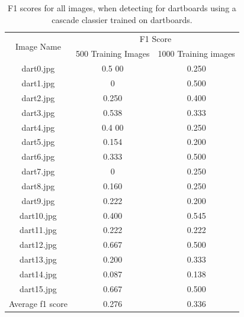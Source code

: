 \documentclass[conference]{IEEEtran}
\begin{document}
\begin{table}[htp]
\caption{F1 scores for all images, when detecting for dartboards using a cascade classier trained on dartboards.}
\begin{center}
\begin{tabular}{||c|c|c||}
\hline
\multirow{2}{*}{Image Name} & \multicolumn{2}{c||}{F1 Score}                \\ 
                                 & 500 Training Images	& 1000 Training images \\ \hline
dart0.jpg			& 0.5	00	&	0.250	\\
dart1.jpg			& 0		&	0.500	\\
dart2.jpg			& 0.250	&	0.400	\\
dart3.jpg			& 0.538	&	0.333	\\
dart4.jpg			& 0.4	00	&	0.250	\\
dart5.jpg			& 0.154	&	0.200	\\
dart6.jpg			& 0.333	&	0.500	\\
dart7.jpg			& 0		&	0.250	\\
dart8.jpg			& 0.160	&	0.250	\\
dart9.jpg			& 0.222	&	0.200	\\
dart10.jpg			& 0.400	&	0.545	\\
dart11.jpg			& 0.222	&	0.222	\\
dart12.jpg			& 0.667	&	0.500	\\
dart13.jpg			& 0.200	&	0.333	\\
dart14.jpg			& 0.087	&	0.138	\\
dart15.jpg			& 0.667	&	0.500	\\ \hline
Average f1 score 	& 0.276	&	0.336	\\ \hline
\end{tabular}
\end{center}
\label{default}
\end{table}%
\newpage
\end{document}
